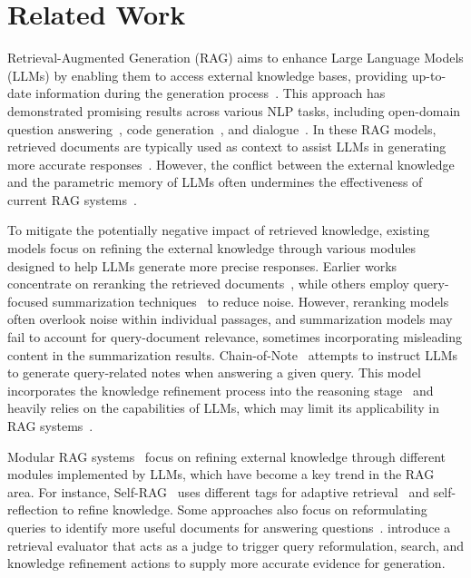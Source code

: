 \section{Related Work}
Retrieval-Augmented Generation (RAG) aims to enhance Large Language Models (LLMs) by enabling them to access external knowledge bases, providing up-to-date information during the generation process~\cite{shi-etal-2024-replug, ram-etal-2023-context}. This approach has demonstrated promising results across various NLP tasks, including open-domain question answering~\cite{izacard2022few}, code generation~\cite{zhou2023docprompting}, and dialogue~\cite{shuster2022blenderbot}. In these RAG models, retrieved documents are typically used as context to assist LLMs in generating more accurate responses~\cite{ram-etal-2023-context}. However, the conflict between the external knowledge and the parametric memory of LLMs often undermines the effectiveness of current RAG systems~\cite{asai2024reliable, xie2024adaptive, chen2024benchmarking}.

To mitigate the potentially negative impact of retrieved knowledge, existing models focus on refining the external knowledge through various modules designed to help LLMs generate more precise responses. Earlier works concentrate on reranking the retrieved documents~\cite{yu2023augmentation,shi-etal-2024-replug,yu2024rankrag}, while others employ query-focused summarization techniques~\cite{vig2021exploring,xu2023lmgqs} to reduce noise. However, reranking models often overlook noise within individual passages, and summarization models may fail to account for query-document relevance, sometimes incorporating misleading content in the summarization results. Chain-of-Note~\cite{yu-etal-2024-chain} attempts to instruct LLMs to generate query-related notes when answering a given query. This model incorporates the knowledge refinement process into the reasoning stage~\cite{wei2022chain} and heavily relies on the capabilities of LLMs, which may limit its applicability in RAG systems~\cite{gao2024modular}.

Modular RAG systems~\cite{gao2024modular,xu2024activerag} focus on refining external knowledge through different modules implemented by LLMs, which have become a key trend in the RAG area.
For instance, Self-RAG~\cite{asai2024selfrag} uses different tags for adaptive retrieval~\cite{jiang2023active} and self-reflection to refine knowledge. Some approaches also focus on reformulating queries to identify more useful documents for answering questions~\cite{yan2024corrective,trivedi2023interleaving}. \citet{yan2024corrective} introduce a retrieval evaluator that acts as a judge to trigger query reformulation, search, and knowledge refinement actions to supply more accurate evidence for generation.

